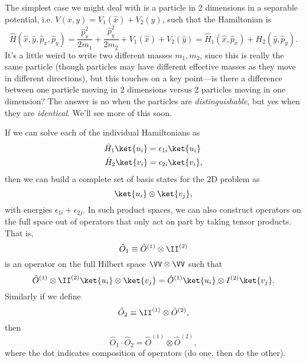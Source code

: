 The simplest case we might deal with is a particle in 2 dimensions in a separable potential, i.e. $V(x,y)= V_1(\hat x) + V_2 (\hat y)$, such that the Hamiltonian is
\begin{equation}
    \hat H (\hat x,\hat y, \hat p_x, \hat p_y) = \frac{\hat p_x^2}{2m_1}+ \frac{\hat p_y^2}{2m_2} + V_1(\hat x) + V_2(\hat y) = \hat H_1(\hat x, \hat p_x) + H_2(\hat y,\hat p_y).
\end{equation}
It's a little weird to write two different masses $m_1,m_2$, since this is really the same particle (though particles may have different effective masses as they move in different directions), but this touches on a key point---is there a difference between one particle moving in 2 dimensions versus 2 particles moving in one dimension? The answer is no when the particles are \emph{distinguishable}, but yes when they are \emph{identical}. We'll see more of this soon.

If we can solve each of the individual Hamiltonians as
\begin{align}
    \hat H_1 \ket{u_i} &= \epsilon_{1i} \ket{u_i}\\
    \hat H_2 \ket{v_i} &= \epsilon_{2i} \ket{v_i},
\end{align}
then we can build a complete set of basis states for the 2D problem as
\begin{equation}
    \ket{u_i} \otimes\ket{v_j},
\end{equation}
with energies $\epsilon_{1i} + \epsilon_{2j}.$
In such product spaces, we can also construct operators on the full space out of operators that only act on part by taking tensor products. That is,
\begin{equation}
    \hat O_1 \equiv \hat O^{(1)} \otimes \II^{(2)}
\end{equation}
is an operator on the full Hilbert space $\VV\otimes \VV$ such that
\begin{equation}
    \hat O^{(1)} \otimes \II^{(2)} \ket{u_i} \otimes \ket{v_j} = \hat O^{(1)} \ket{u_i} \otimes I^{(2)} \ket{v_j}.
\end{equation}
Similarly if we define
\begin{equation}
    \hat O_2 \equiv \II^{(1)} \otimes \hat O^{(2)},
\end{equation}
then
\begin{equation}
    \hat O_1 \cdot \hat O_2 = \hat O^{(1)} \otimes \hat O^{(2)},
\end{equation}
where the dot indicates composition of operators (do one, then do the other).

